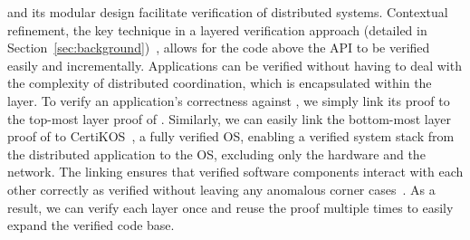 
\sysname{} and its modular \WOR{} design facilitate verification of distributed systems. Contextual refinement, the key technique in a layered verification approach (detailed in Section~\ref{sec:background})~\cite{deepspec}, allows for the code above the \sysname{} API to be verified easily and incrementally. Applications can be verified without having to deal with the complexity of distributed coordination, which is encapsulated within the \WOR{} layer. To verify an application's correctness against \sysname{}, we simply link its proof to the top-most layer proof of \sysname{}. Similarly, we can easily link the bottom-most layer proof of \sysname{} to CertiKOS~\cite{certikos:osdi16}, a fully verified OS, enabling a verified system stack from the distributed application to the OS, excluding only the hardware and the network. The linking ensures that verified software components interact with each other correctly as verified without leaving any anomalous corner cases~\cite{shimlayer}. As a result, we can verify each layer once and reuse the proof multiple times to easily expand the verified code base.


